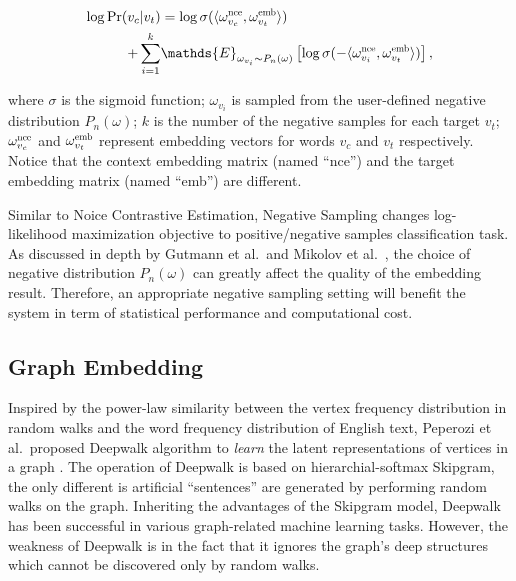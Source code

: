 \documentclass[letterpaper]{article}
\begin{document}
            \begin{equation}
                \label{eq:objneg}
                \begin{aligned}
                \log \mbox{Pr} (v_c | v_t) & = \log \sigma( \langle \omega^{\scalebox{0.7}{nce}}_{v_c} , \omega^{\scalebox{0.7}{emb}}_{v_t} \rangle ) \\
                + \sum_{i=1}^{k} & \mathds{E}_{\omega_{v_i} \sim P_n(\omega)} \left[ \log \sigma( -\langle \omega^{\scalebox{0.7}{nce}}_{v_i} , \omega^{\scalebox{0.7}{emb}}_{v_t} \rangle) \right],
                \end{aligned}
            \end{equation}
            
            \noindent
            where $\sigma$ is the sigmoid function; $\omega_{v_i}$ is sampled from the user-defined
            negative distribution $P_n(\omega)$; $k$ is the number of the negative samples for each target
            $v_t$; $\omega^{\scalebox{0.7}{nce}}_{v_c}$ and $\omega^{\scalebox{0.7}{emb}}_{v_t}$ 
            represent embedding vectors for words $v_c$ and $v_t$ respectively. Notice that the
            context embedding matrix (named ``nce'') and the target embedding matrix (named ``emb'')
            are different.

            Similar to Noice Contrastive Estimation, Negative Sampling changes log-likelihood
            maximization objective to positive/negative samples classification task. As discussed
            in depth by Gutmann et al.\ and Mikolov et al.\ , the choice of negative distribution 
            $P_n(\omega)$ can greatly affect the quality of the embedding result. Therefore, an
            appropriate negative sampling setting will benefit the system in term of statistical
            performance and computational cost.

        \subsection{Graph Embedding}
            
            Inspired by the power-law similarity between the vertex frequency distribution in
            random walks and the word frequency distribution of English text, Peperozi et al.\ proposed
            Deepwalk algorithm to \emph{learn} the latent representations of vertices in a
            graph \cite{deepwalk}. The operation of Deepwalk is based on hierarchial-softmax
            Skipgram, the only different is artificial ``sentences'' are generated by performing
            random walks on the graph. Inheriting the advantages of the Skipgram model, Deepwalk
            has been successful in various graph-related machine learning tasks. However, the weakness
            of Deepwalk is in the fact that it ignores the graph's deep structures which cannot 
            be discovered only by random walks. 
\end{document}
